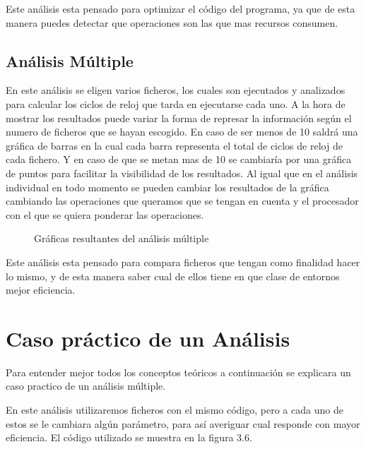 

Este análisis esta pensado para optimizar el código del programa, ya que de esta manera puedes detectar que operaciones son las que mas recursos consumen.

\subsection{Análisis Múltiple}
En este análisis se eligen varios ficheros, los cuales son ejecutados y analizados para calcular los ciclos de reloj que tarda en ejecutarse cada uno. A la hora de mostrar los resultados puede variar la forma de represar la  información según el numero de ficheros que se hayan escogido. En caso de ser menos de 10 saldrá una gráfica de barras en la cual cada barra representa el total de ciclos de reloj de cada fichero. Y en caso de que se metan mas de 10 se cambiaría por una  gráfica de puntos para facilitar la visibilidad de los resultados. Al igual que en el análisis  individual en todo momento se pueden cambiar los resultados  de la gráfica cambiando las operaciones que queramos que se tengan en cuenta y el procesador  con el que se quiera ponderar las operaciones.\\

\begin{figure}[H]
\centering
{}
\caption{Gráficas resultantes del análisis múltiple}
\end{figure}


Este análisis esta pensado para compara ficheros que tengan como finalidad hacer lo mismo, y de esta manera saber cual de ellos tiene en que clase de entornos mejor eficiencia.


\section{Caso práctico de un Análisis}
Para entender mejor todos los conceptos teóricos a continuación se explicara un caso practico de un análisis múltiple.

En este análisis utilizaremos ficheros con el mismo código, pero a cada uno de estos se le cambiara algún parámetro, para así averiguar cual responde con mayor eficiencia. El código utilizado se muestra en la figura 3.6.

